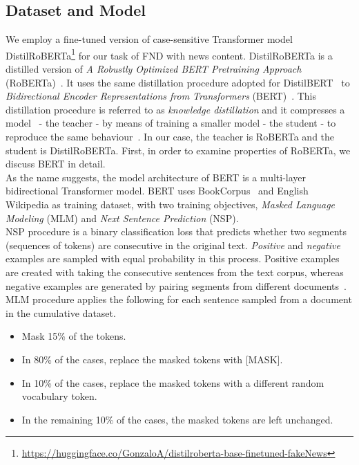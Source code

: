 \subsection{Dataset and Model}
\label{subsec:newContentModel_DatasetAndModel}
We employ a fine-tuned version of case-sensitive Transformer model DistilRoBERTa\footnote{\url{https://huggingface.co/GonzaloA/distilroberta-base-finetuned-fakeNews}} for our task of FND with news content. DistilRoBERTa is a distilled version of \emph{A Robustly Optimized BERT Pretraining Approach} (RoBERTa)~\parencite{RoBERTa_Liu}. It uses the same distillation procedure adopted for  DistilBERT~\parencite{DistilBERT_Sanh} to \emph{Bidirectional Encoder Representations from Transformers} (BERT)~\parencite{BERT_Devlin}. This distillation procedure is referred to as \emph{knowledge distillation} and it compresses a model~\parencite{ModelCompression_Bucilua} - the teacher - by means of training a smaller model - the student - to reproduce the same behaviour~\parencite{DistillingTheKnowledge_Hinton}. In our case, the teacher is  RoBERTa and the student is DistilRoBERTa. First, in order to examine properties of RoBERTa, we discuss BERT in detail.\\
As the name suggests, the model architecture of BERT is a multi-layer bidirectional Transformer model. BERT uses BookCorpus~\parencite{BookCorpus_Yukun} and English Wikipedia as training dataset, with two training objectives, \emph{Masked Language Modeling} (MLM) and \emph{Next Sentence Prediction} (NSP).\\
NSP procedure is a binary classification loss that predicts whether two segments (sequences of tokens) are consecutive in
the original text. \emph{Positive} and \emph{negative} examples are sampled with equal probability in this process.
Positive examples are created with taking the consecutive sentences from the text corpus, whereas negative examples
are generated by pairing segments from different documents~\parencite{BERT_Devlin,RoBERTa_Liu}.\\
MLM procedure applies the following for each sentence sampled from a document in the cumulative dataset.
\begin{itemize}
    \item Mask 15\% of the tokens.
    \item In 80\% of the cases, replace the masked tokens with [MASK].
    \item In 10\% of the cases, replace the masked tokens with a different random vocabulary token.
    \item In the remaining 10\% of the cases, the masked tokens are left unchanged.
\end{itemize}
